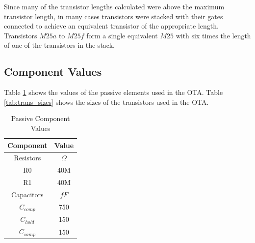 \documentclass[journal]{IEEEtran}
\begin{document}
Since many of the transistor lengths calculated were above the maximum transistor length, in many cases transistors were stacked with their gates connected to achieve an equivalent transistor of the appropriate length. Transistors $M25a$ to $M25f$ form a single equivalent $M25$ with  six times the length of one of the transistors in the stack.

\subsection{Component Values}
Table \ref{tab:passive_elements} shows the values of the passive elements used in the OTA. Table \ref{tab:trans_sizes} shows the sizes of the transistors used in the OTA.

\begin{table}
\centering
\caption{Passive Component Values}
\label{tab:passive_elements}
\begin{tabular}{|c|c|}
\hline Component & Value \\ 
\hline Resistors & $\Omega$ \\ 
\hline R0 & 40M \\ 
\hline R1 & 40M \\ 
\hline Capacitors & $fF$ \\ 
\hline $C_{comp}$ & 750 \\ 
\hline $C_{hold}$ & 150 \\ 
\hline $C_{samp}$ & 150 \\ 
\hline 
\end{tabular} 
\end{table}
\end{document}
